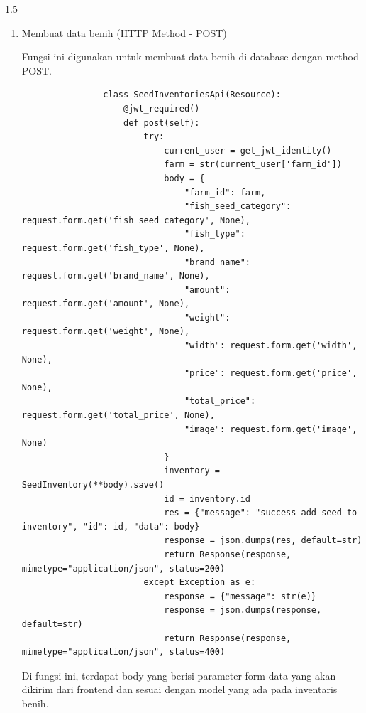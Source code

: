 \begin{spacing}{1.5}
\begin{enumerate}
\begin{enumerate}
			\begin{lstlisting}
				class SeedInventoryApi(Resource):
					def get(self, id):
						try:
							pipeline = {"$match": {"id_int": int(id)}},
							testing = SeedInventory.objects.aggregate(pipeline)
							temp = list(testing)
							if len(temp) == 0:
								res = {"message": 'no data found'}
								response = json.dumps(res, default=str)
								return Response(response, mimetype="application/json", status=200)
							response = json.dumps({
								'status': 'success',
								'data': temp[0],
							}, default=str)
							return Response(response, mimetype="application/json", status=200)
						except Exception as e:
							response = {"message": e}
							response = json.dumps(response, default=str)
							return Response(response, mimetype="application/json", status=400)
			\end{lstlisting}

			\item Membuat data benih (HTTP Method - POST)
			
			Fungsi ini digunakan untuk membuat data benih di database dengan method POST.
			
			\begin{lstlisting}
				class SeedInventoriesApi(Resource):
					@jwt_required()
					def post(self):
						try:
							current_user = get_jwt_identity()
							farm = str(current_user['farm_id'])
							body = {
								"farm_id": farm,
								"fish_seed_category": request.form.get('fish_seed_category', None),
								"fish_type": request.form.get('fish_type', None),
								"brand_name": request.form.get('brand_name', None),
								"amount": request.form.get('amount', None),
								"weight": request.form.get('weight', None),
								"width": request.form.get('width', None),
								"price": request.form.get('price', None),
								"total_price": request.form.get('total_price', None),
								"image": request.form.get('image', None)
							}
							inventory = SeedInventory(**body).save()
							id = inventory.id
							res = {"message": "success add seed to inventory", "id": id, "data": body}
							response = json.dumps(res, default=str)
							return Response(response, mimetype="application/json", status=200)
						except Exception as e:
							response = {"message": str(e)}
							response = json.dumps(response, default=str)
							return Response(response, mimetype="application/json", status=400)
			\end{lstlisting}

			Di fungsi ini, terdapat body yang berisi parameter form data yang akan dikirim dari frontend dan sesuai dengan model yang ada pada inventaris benih.


\end{enumerate}
\end{enumerate}
\end{spacing}
